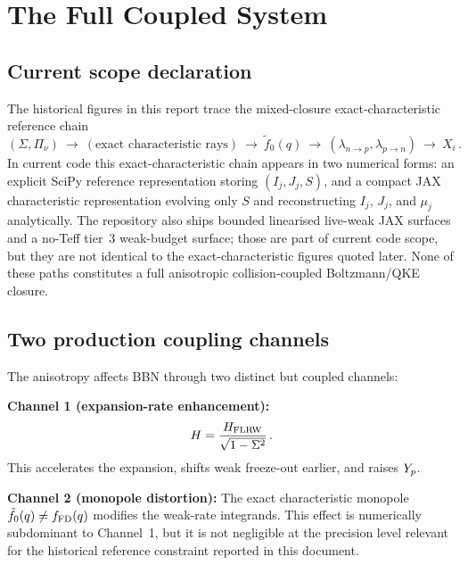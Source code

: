 \section{The Full Coupled System}\label{sec:coupled}

\subsection{Current scope declaration}

The historical figures in this report trace the mixed-closure exact-characteristic reference chain
\begin{equation}
(\Sigma,\Pi_\nu)\ \longrightarrow\ (\text{exact characteristic rays})\ \longrightarrow\ \tilde f_0(q)\ \longrightarrow\ (\lambda_{n\to p},\lambda_{p\to n})\ \longrightarrow\ X_i\,.
\end{equation}
In current code this exact-characteristic chain appears in two numerical forms: an explicit SciPy reference representation storing $(I_j,J_j,S)$, and a compact JAX characteristic representation evolving only $S$ and reconstructing $I_j$, $J_j$, and $\mu_j$ analytically.  The repository also ships bounded linearised live-weak JAX surfaces and a no-Teff tier~3 weak-budget surface; those are part of current code scope, but they are not identical to the exact-characteristic figures quoted later.  None of these paths constitutes a full anisotropic collision-coupled Boltzmann/QKE closure.

\subsection{Two production coupling channels}

The anisotropy affects BBN through two distinct but coupled channels:

\textbf{Channel 1 (expansion-rate enhancement):}
\begin{equation}
H = \frac{H_{\mathrm{FLRW}}}{\sqrt{1 - \Sigma^2}}\,.
\end{equation}
This accelerates the expansion, shifts weak freeze-out earlier, and raises $Y_p$.

\textbf{Channel 2 (monopole distortion):}
The exact characteristic monopole $\tilde f_0(q) \neq f_{\rm FD}(q)$ modifies the weak-rate integrands.  This effect is numerically subdominant to Channel~1, but it is not negligible at the precision level relevant for the historical reference constraint reported in this document.


